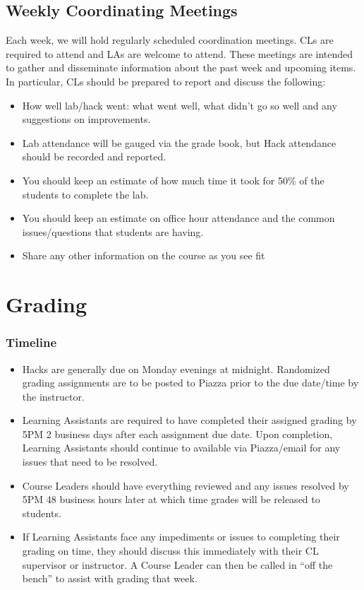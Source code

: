 \documentclass[12pt]{scrartcl}
\begin{document}
\subsection*{Weekly Coordinating Meetings}

Each week, we will hold regularly scheduled coordination meetings.  CLs are
required to attend and LAs are welcome to attend.
These meetings are intended to gather and disseminate information about the past
week and upcoming items.  In particular, CLs should be prepared to report and
discuss the following:
\begin{itemize}
  \item How well lab/hack went: what went well, what didn't go so well and any
  suggestions on improvements.
  \item Lab attendance will be gauged via the grade book, but Hack attendance 
  should be recorded and reported.
  \item You should keep an estimate of how much time it took for 50\% of the
  students to complete the lab.
  \item You should keep an estimate on office hour attendance and the common
  issues/questions that students are having.
  \item Share any other information on the course as you see fit
\end{itemize}

\section*{Grading}

\subsubsection*{Timeline}

\begin{itemize}
  \item Hacks are generally due on Monday evenings at midnight.  
    Randomized grading assignments are to 
    be posted to Piazza prior to the due date/time by the instructor.
  \item Learning Assistants are required to have completed their assigned
    grading by 5PM 2 business days after each assignment due date.
    Upon completion, Learning Assistants should continue to available via
    Piazza/email for any issues that need to be resolved.
  \item Course Leaders should have everything reviewed and
    any issues resolved by 5PM 48 business hours later at which time grades
    will be released to students.
  \item If Learning Assistants face any impediments or issues to completing
    their grading on time, they should discuss this immediately with their CL
    supervisor or instructor.  A Course Leader can then be called
    in ``off the bench'' to assist with grading that week.
\end{itemize}
\end{document}
